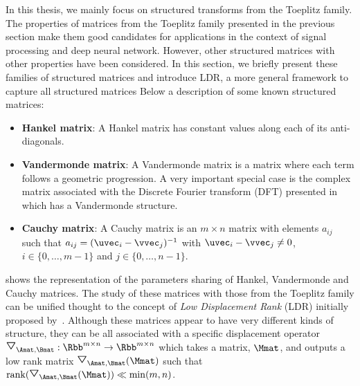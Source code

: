 In this thesis, we mainly focus on structured transforms from the Toeplitz family.
The properties of matrices from the Toeplitz family presented in the previous section make them good candidates for applications in the context of signal processing and deep neural network.
However, other structured matrices with other properties have been considered.
In this section, we briefly present these families of structured matrices and introduce LDR, a more general framework to capture all structured matrices
Below a description of some known structured matrices: 
\begin{itemize}
  \item \textbf{Hankel matrix}: A Hankel matrix has constant values along each of its anti-diagonals.
  \item \textbf{Vandermonde matrix}: A Vandermonde matrix is a matrix where each term follows a geometric progression.
    A very important special case is the complex matrix associated with the Discrete Fourier transform (DFT) presented in  which has a Vandermonde structure.
  \item \textbf{Cauchy matrix}: A Cauchy matrix is an $m \times n$ matrix with elements $a_{ij}$ such that $a_{ij} = (\uvec_i - \vvec_j)^{-1}$ with $\uvec_i - \vvec_j \neq 0$, $i \in \{0,\dots,m-1\}$ and $j \in \{0,\dots,n-1\}$.
\end{itemize}
 shows the representation of the parameters sharing of Hankel, Vandermonde and Cauchy matrices.
The study of these matrices with those from the Toeplitz family can be unified thought to the concept of \emph{Low Displacement Rank} (LDR) initially proposed by~\citet{kailath1979displacement}.
Although these matrices appear to have very different kinds of structure, they can be all associated with a specific displacement operator $\triangleopdown_{\Amat, \Bmat}: \Rbb^{m \times n} \rightarrow \Rbb^{m \times n}$ which takes a matrix, $\Mmat$, and outputs a low rank matrix $\triangleopdown_{\Amat, \Bmat}(\Mmat)$ such that $\rank(\triangleopdown_{\Amat, \Bmat}(\Mmat)) \ll \min(m,n)$.



